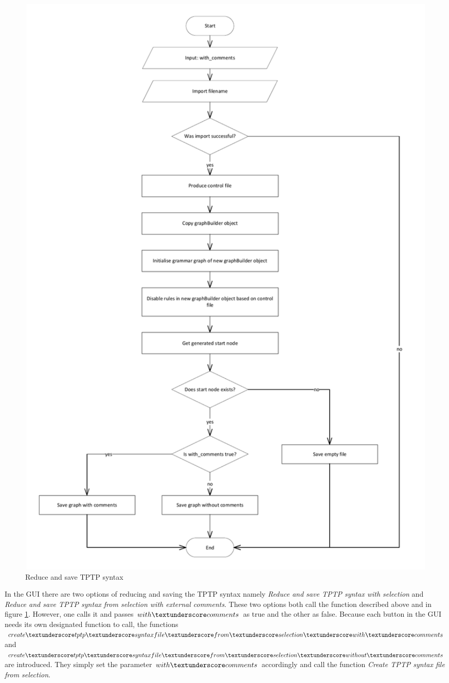 \begin{figure}[H]
\includegraphics[width=1.05\textwidth]{images/implementation_reduce_and_save_tptp_syntax.pdf}
\caption{Reduce and save \ac{TPTP} syntax}
\label{fig:ImplementationGUIReduceandSave}
\end{figure}

In the GUI there are two options of reducing and saving the \ac{TPTP} syntax namely \textit{Reduce and save \ac{TPTP} syntax with selection} and \textit{Reduce and save \ac{TPTP} syntax from selection with external comments}.
These two options both call the function described above and in figure \ref{fig:ImplementationGUIReduceandSave}. However, one calls it and passes $with\textunderscore comments$ as true and the other as false.
Because each button in the GUI needs its own designated function to call, the functions $create\textunderscore tptp\textunderscore syntax file\textunderscore from\textunderscore selection\textunderscore with\textunderscore comments$ and $create\textunderscore tptp\textunderscore syntax file\textunderscore from\textunderscore selection\textunderscore without\textunderscore comments$ are introduced.
They simply set the parameter $with\textunderscore comments$ accordingly and call the function \textit{Create \ac{TPTP} syntax file from selection}.

